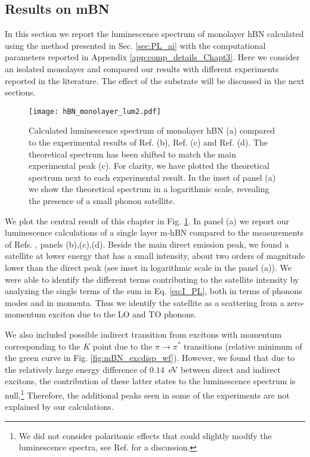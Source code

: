 \subsection{Results on mBN}
In this section we report the luminescence spectrum of monolayer hBN calculated using the method presented in Sec. \ref{sec:PL_ai} with the computational parameters reported in Appendix \ref{app:comp_details_Chapt3}. Here we consider an isolated monolayer and compared our results with different experiments reported in the literature. The effect of the substrate will be discussed in the next sections.
\begin{figure}[H]
	\vspace{0.2cm}
	\setcapindent{2em}
	\centering
	\texttt{[image: hBN\_monolayer\_lum2.pdf]}
	\caption{Calculated luminescence spectrum of monolayer hBN (a) compared to the experimental results of Ref. \cite{elias2019direct}(b), Ref. \cite{rousseau2021monolayer}(c) and Ref. \cite{wang2022scalable}(d). The theoretical spectrum has been shifted to match the main experimental peak (c). For clarity, we have plotted the theoretical spectrum next to each experimental result. In the inset of panel (a) we show the theoretical spectrum in a logarithmic scale, revealing the presence of a small phonon satellite.} 
	\label{fig:mBN_PL} 
\end{figure}
We plot the central result of this chapter in Fig. \ref{fig:mBN_PL}. In panel (a) we report our luminescence calculations of a single layer m-hBN compared to the measurements of Refs. \cite{elias2019direct,wang2022scalable,rousseau2021monolayer}, panels (b),(c),(d). Beside the main direct emission peak, we found a satellite at lower energy that has a small intensity, about two orders of magnitude lower than the direct peak (see inset in logarithmic scale in the panel (a)). We were able to identify the different terms contributing to the satellite intensity by analyzing the single terms of the sum in Eq. \eqref{eq:I_PL}, both in terms of phonons modes and in momenta. Thus we identify the satellite as a scattering from a zero-momentum exciton due to the LO and TO phonons.

 We also included possible indirect transition from excitons with momentum corresponding to the $K$ point due to the $\pi \rightarrow \pi^*$ transitions (relative minimum of the green curve in Fig. \ref{fig:mBN_excdisp_wf}). However, we found that due to the relatively large energy difference of $0.14$~eV between direct and indirect excitons, the contribution of these latter states to the luminescence spectrum is null.\footnote{We did not consider polaritonic effects that could slightly modify the luminescence spectra, see Ref. \cite{henriques2019optical} for a discussion.} Therefore, the additional peaks seen in some of the experiments are not explained by our calculations.

